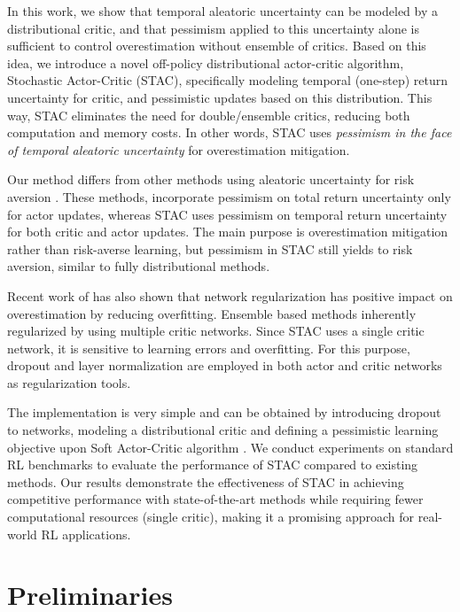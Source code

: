 \documentclass{article}
\begin{document}
In this work, we show that temporal aleatoric uncertainty can be modeled by a distributional critic, and that pessimism applied to this uncertainty alone is sufficient to control overestimation without ensemble of critics. Based on this idea, we introduce a novel off-policy distributional actor-critic algorithm, Stochastic Actor-Critic (STAC), specifically modeling temporal (one-step) return uncertainty for critic, and pessimistic updates based on this distribution. This way, STAC eliminates the need for double/ensemble critics, reducing both computation and memory costs. In other words, STAC uses \textit{pessimism in the face of temporal aleatoric uncertainty} for overestimation mitigation.  

Our method differs from other methods using aleatoric uncertainty for risk aversion \citet{tang2019worst, yang2021wcsac, kim2022efficient, ma2025dsac}. These methods, incorporate pessimism on total return uncertainty only for actor updates, whereas STAC uses pessimism on temporal return uncertainty for both critic and actor updates. The main purpose is overestimation mitigation rather than risk-averse learning, but pessimism in STAC still yields to risk aversion, similar to fully distributional methods. 

Recent work of \citet{nauman2024overestimation} has also shown that network regularization has positive impact on overestimation by reducing overfitting. Ensemble based methods inherently regularized by using multiple critic networks. Since STAC uses a single critic network, it is sensitive to learning errors and overfitting. For this purpose, dropout \citep{srivastava2014dropout} and layer normalization \citep{ba2016layer} are employed in both actor and critic networks as regularization tools.

The implementation is very simple and can be obtained by introducing dropout to networks, modeling a distributional critic and defining a pessimistic learning objective upon Soft Actor-Critic algorithm \citep{haarnoja2018soft}. We conduct experiments on standard RL benchmarks to evaluate the performance of STAC compared to existing methods. Our results demonstrate the effectiveness of STAC in achieving competitive performance with state-of-the-art methods while requiring fewer computational resources (single critic), making it a promising approach for real-world RL applications. 

\section{Preliminaries}
\end{document}
